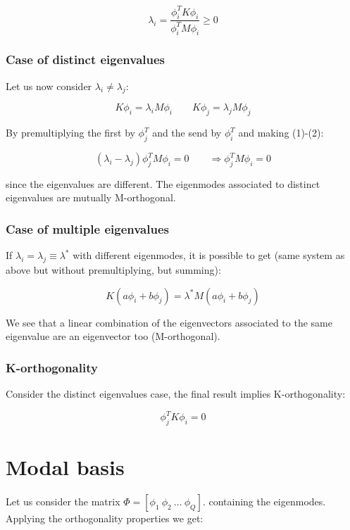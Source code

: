 	\begin{equation}
	\lambda _i = \frac{\phi _i^T K \phi _i}{\phi _i^T M \phi _i} \geq 0
	\end{equation}
	
\subsubsection{Case of distinct eigenvalues}
	Let us now consider $\lambda _i \neq \lambda _j$: 
	
	\begin{equation}
	K \phi _i = \lambda _i M\phi _i \qquad K \phi _j = \lambda _j M\phi _j
	\end{equation}
	
	By premultiplying the first by $\phi _j^T$ and the send by $\phi ^T_i$ and making (1)-(2):
	 
	 \begin{equation}
	 (\lambda _i - \lambda _j) \phi _j^T M \phi _i = 0 \qquad \Rightarrow \phi _j^T M \phi _i = 0
	 \end{equation}
	 
	 since the eigenvalues are different. The eigenmodes associated to distinct eigenvalues are mutually M-orthogonal. 
	 
\subsubsection{Case of multiple eigenvalues}
	If $\lambda _i = \lambda _j \equiv \lambda ^*$ with different eigenmodes, it is possible to get (same system as above but without premultiplying, but summing):
	
	\begin{equation}
	K(a\phi _i + b \phi _j) = \lambda ^* M(a\phi _i + b \phi _j)
	\end{equation}
	
	We see that a linear combination of the eigenvectors associated to the same eigenvalue are an eigenvector too (M-orthogonal).
	
\subsubsection{K-orthogonality}
	Consider the distinct eigenvalues case, the final result implies K-orthogonality: 
	
	\begin{equation}
	\phi _j ^T K \phi _i = 0
\end{equation}	 

\section{Modal basis}
	Let us consider the matrix $\Phi = [\phi _1 \ \phi _2 \ \dots \ \phi _Q]$.  containing the eigenmodes. Applying the orthogonality properties we get:
	
